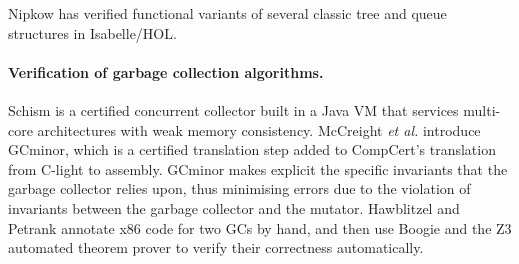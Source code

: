Nipkow \cite{nipkow2017} has verified functional variants of 
several classic
tree and queue structures in Isabelle/HOL. 

\paragraph{Verification of garbage collection algorithms.}
Schism \cite{gcexample4,gcexample4a} is a certified concurrent
collector built in a Java VM that services multi-core architectures with weak memory consistency.
McCreight \emph{et al.} \cite{gcexample5, gcexample3} introduce GCminor, which is
a certified translation step added to CompCert's translation from C-light to assembly.
GCminor makes explicit the specific invariants that the garbage collector
relies upon, thus minimising errors due to the violation of invariants
between the garbage collector and the mutator.
Hawblitzel and Petrank \cite{gcexample2} annotate x86 code
for two GCs by hand, and then use Boogie and the Z3 automated theorem prover
to verify their correctness automatically.





